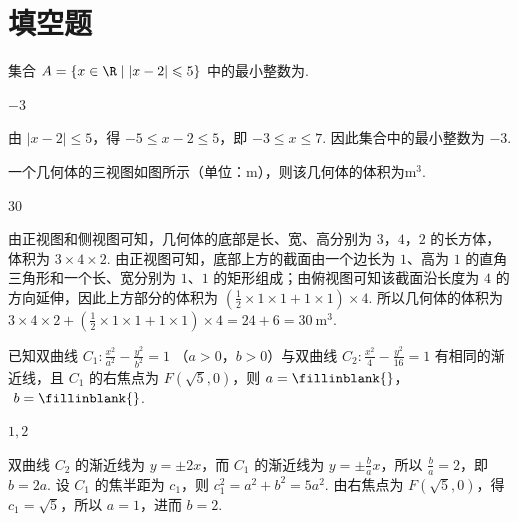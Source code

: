 \section{填空题}

\begin{problem}
集合 \(A = \{x \in \R \mid |x - 2| \leqslant 5\}\) 中的最小整数为\fillinblank{}.
\end{problem}

\begin{answer}
\(-3\)
\end{answer}

\begin{solution}
由 \(\lvert x-2\rvert\leqslant5\)，得 \(-5\leqslant x-2\leqslant5\)，即 \(-3\leqslant x\leqslant7\). 因此集合中的最小整数为 \(-3\).
\end{solution}

\begin{problem}
一个几何体的三视图如图所示（单位：\(\mathrm{m}\)），则该几何体的体积为\fillinblank{}\(\mathrm{m}^3\).

\end{problem}

\begin{answer}
30
\end{answer}

\begin{solution}
由正视图和侧视图可知，几何体的底部是长、宽、高分别为 \(3\)，\(4\)，\(2\) 的长方体，体积为 \(3\times4\times2\). 由正视图可知，底部上方的截面由一个边长为 \(1\)、高为 \(1\) 的直角三角形和一个长、宽分别为 \(1\)、\(1\) 的矩形组成；由俯视图可知该截面沿长度为 \(4\) 的方向延伸，因此上方部分的体积为 \(\left(\frac12\times1\times1+1\times1\right)\times4\). 所以几何体的体积为 \(3\times4\times2+\left(\frac12\times1\times1+1\times1\right)\times4=24+6=30\ \mathrm{m}^3\).
\end{solution}

\begin{problem}
已知双曲线 \(C_{1}:\frac{x^{2}}{a^{2}} -\frac{y^{2}}{b^{2}} = 1\) （\(a > 0\)，\(b > 0\)）与双曲线 \(C_2:\frac{x^2}{4} -\frac{y^2}{16} = 1\) 有相同的渐近线，且 \(C_1\) 的右焦点为 \(F(\sqrt{5},0)\)，则 \(a =\fillinblank{}\)，\(\ b =\fillinblank{}\).
\end{problem}

\begin{answer}
\(1,2\)
\end{answer}

\begin{solution}
双曲线 \(C_2\) 的渐近线为 \(y=\pm2x\)，而 \(C_1\) 的渐近线为 \(y=\pm\frac{b}{a}x\)，所以 \(\frac{b}{a}=2\)，即 \(b=2a\). 设 \(C_1\) 的焦半距为 \(c_1\)，则 \(c_1^2=a^2+b^2=5a^2\). 由右焦点为 \(F(\sqrt5,0)\)，得 \(c_1=\sqrt5\)，所以 \(a=1\)，进而 \(b=2\).
\end{solution}

